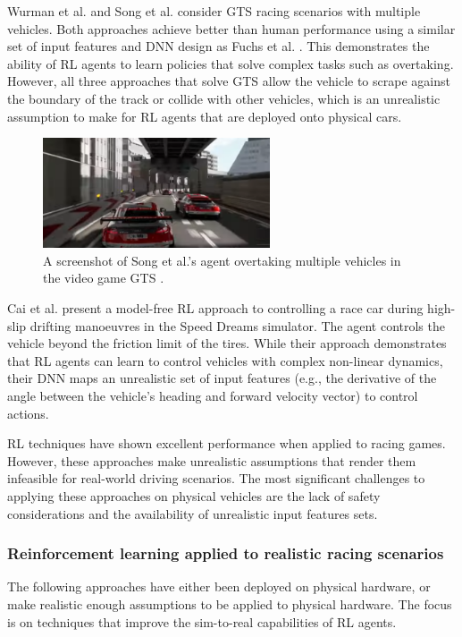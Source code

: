 Wurman et al. \cite{Wurman2022} and Song et al. \cite{Song2021} consider GTS racing scenarios with multiple vehicles.
Both approaches achieve better than human performance using a similar set of input features and DNN design as Fuchs et al. \cite{Fuchs2021}.
This demonstrates the ability of RL agents to learn policies that solve complex tasks such as overtaking. 
However, all three approaches that solve GTS allow the vehicle to scrape against the boundary of the track or collide with other vehicles, which is an unrealistic assumption to make for RL agents that are deployed onto physical cars.

\begin{figure}[htb!]
    \centering
    \includegraphics[width=0.6\textwidth]{contents/chapt2/figs/GTS.PNG}
    \caption[An RL agent overtaking multiple vehicles in GTS]{A screenshot of Song et al.'s agent overtaking multiple vehicles in the video game GTS \cite{Song2021}.}
    \label{fig:GTS}
\end{figure}

Cai et al. \cite{Cai2020} present a model-free RL approach to controlling a race car during high-slip drifting manoeuvres in the Speed Dreams simulator.
The agent controls the vehicle beyond the friction limit of the tires.
While their approach demonstrates that RL agents can learn to control vehicles with complex non-linear dynamics, their DNN maps an unrealistic set of input features (e.g., the derivative of the angle between the vehicle's heading and forward velocity vector) to control actions. 

RL techniques have shown excellent performance when applied to racing games. 
However, these approaches make unrealistic assumptions that render them infeasible for real-world driving scenarios.
The most significant challenges to applying these approaches on physical vehicles are the lack of safety considerations and the availability of unrealistic input features sets.


\subsubsection*{Reinforcement learning applied to realistic racing scenarios}
The following approaches have either been deployed on physical hardware, or make realistic enough assumptions to be applied to physical hardware.
The focus is on techniques that improve the sim-to-real capabilities of RL agents.

